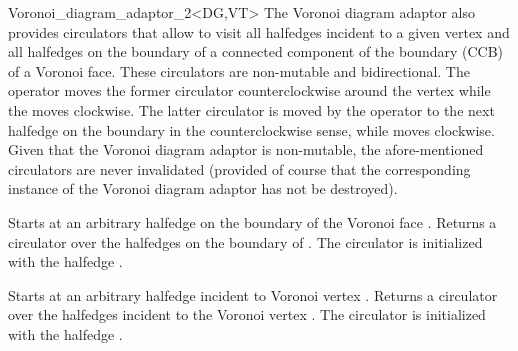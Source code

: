 \begin{ccRefClass}{Voronoi_diagram_adaptor_2<DG,VT>}
The Voronoi diagram adaptor also provides circulators that allow to visit 
all halfedges incident to a given vertex and all halfedges
on the boundary of a connected component of the boundary (CCB) of a
Voronoi face. These circulators are non-mutable and bidirectional.
The operator  moves the former circulator counterclockwise
around the vertex while the  moves clockwise.
The latter circulator is moved by the operator  to the
next halfedge on the boundary in the counterclockwise sense, while
 moves clockwise.
Given that the Voronoi diagram adaptor is non-mutable, the
afore-mentioned circulators are never invalidated (provided of course
that the corresponding instance of the Voronoi diagram adaptor has not
be destroyed).

\ccThreeToTwo
%
{Starts at an arbitrary halfedge on the boundary of the Voronoi face
  .}
\ccGlue
{} 
{Returns a circulator over the halfedges on the boundary of
  . The circulator is initialized with the halfedge .
  }

\ccThreeToTwo
%
{Starts at an arbitrary halfedge incident to Voronoi vertex .}
\ccGlue
{}
{Returns a circulator over the halfedges incident to the Voronoi
  vertex . The circulator is initialized with the halfedge
  .
  }




\end{ccRefClass}
